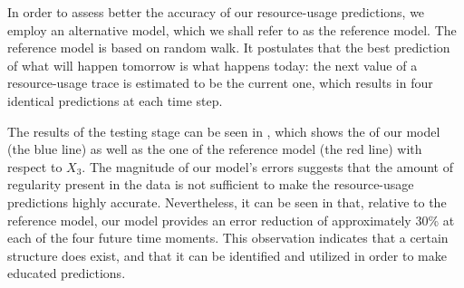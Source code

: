 In order to assess better the accuracy of our resource-usage predictions, we
employ an alternative model, which we shall refer to as the reference model. The
reference model is based on random walk. It postulates that the best prediction
of what will happen tomorrow is what happens today: the next value of a
resource-usage trace is estimated to be the current one, which results in four
identical predictions at each time step.

The results of the testing stage can be seen in , which shows the
 of our model (the blue line) as well as the one of the reference model
(the red line) with respect to $X_3$. The magnitude of our model's errors
suggests that the amount of regularity present in the data is not sufficient to
make the resource-usage predictions highly accurate. Nevertheless, it can be
seen in  that, relative to the reference model, our model provides
an error reduction of approximately 30\% at each of the four future time
moments. This observation indicates that a certain structure does exist, and
that it can be identified and utilized in order to make educated predictions.
